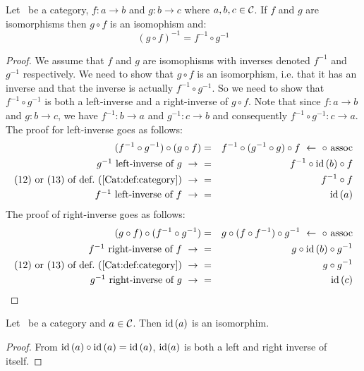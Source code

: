 \begin{prop}\label{Cat:prop:isomorphism:composition}
    Let \Cat\ be a category, $f:a\to b$ and $g:b\to c$ where $a,b,c\in\mbox{$\cal C$}$.
    If $f$ and $g$ are isomorphisms then  $g\circ f$ is an isomophism and:
        \[
            (g\circ f)^{-1} = f^{-1}\circ g^{-1}
        \]
\end{prop}
\begin{proof}
    We assume that $f$ and $g$ are isomophisms with inverses denoted 
    $f^{-1}$ and $g^{-1}$ respectively. We need to show that $g\circ f$
    is an isomorphism, i.e. that it has an inverse and that the inverse
    is actually $f^{-1}\circ g^{-1}$. So we need to show that 
    $f^{-1}\circ g^{-1}$ is both a left-inverse and a right-inverse
    of $g\circ f$. Note that since $f:a\to b$ and $g:b\to c$, we have
    $f^{-1}:b\to a$ and $g^{-1}:c\to b$ and consequently
    $f^{-1}\circ g^{-1}:c \to a$. The proof for left-inverse goes as follows:
        \begin{eqnarray*}(f^{-1}\circ g^{-1})\circ(g\circ f)
            &=&f^{-1}\circ(g^{-1}\circ g)\circ f
            \ \leftarrow\ \circ\ \mbox{assoc}\\
            \mbox{$g^{-1}$ left-inverse of $g$}\ \to\ 
            &=&f^{-1}\circ\id\,(b)\circ f\\
            \mbox{$(12)$ or $(13)$ of def.~(\ref{Cat:def:category})}\ \to\ 
            &=&f^{-1}\circ f\\
            \mbox{$f^{-1}$ left-inverse of $f$}\ \to\ 
            &=&\id\,(a)
        \end{eqnarray*}
The proof of right-inverse goes as follows:
        \begin{eqnarray*}(g\circ f)\circ(f^{-1}\circ g^{-1})
            &=&g\circ (f\circ f^{-1})\circ g^{-1}
            \ \leftarrow\ \circ\ \mbox{assoc}\\
            \mbox{$f^{-1}$ right-inverse of $f$}\ \to\ 
            &=&g\circ\id\,(b)\circ g^{-1}\\
            \mbox{$(12)$ or $(13)$ of def.~(\ref{Cat:def:category})}\ \to\ 
            &=&g\circ g^{-1}\\
            \mbox{$g^{-1}$ right-inverse of $g$}\ \to\ 
            &=&\id\,(c)
        \end{eqnarray*}
\end{proof}

\begin{prop}\label{Cat:prop:isomorphism:identity}
    Let \Cat\ be a category and $a\in\mbox{$\cal C$}$. Then $\mbox{\rm id}\,(a)$ is an isomorphim.
\end{prop}
\begin{proof}
    From $\mbox{\rm id}\,(a)\circ\mbox{\rm id}\,(a)=\mbox{\rm id}\,(a)$, $\mbox{\rm id}(a)$ is both a left
    and right inverse of itself.
\end{proof}

